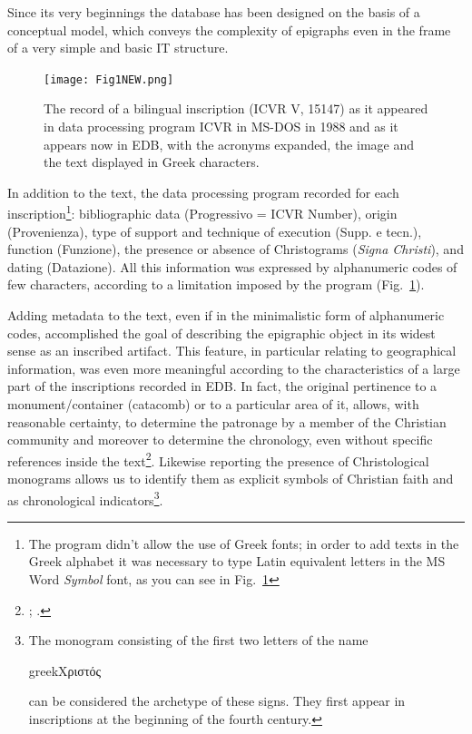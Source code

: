 \documentclass[amsthm,ebook]{saparticle}
\begin{document}
Since its very beginnings the database has been designed on the basis of a conceptual model, which conveys the
complexity of epigraphs even in the frame of a very simple and basic IT structure.



\begin{figure}[hbp]
\centering
 \texttt{[image: Fig1NEW.png]} 
\caption{The record of a bilingual inscription (ICVR V, 15147) as it appeared in data processing program ICVR in MS-DOS
in 1988 and as it appears now in EDB, with the acronyms expanded, the image and the text displayed in Greek characters.}
\label{fig:1}
\end{figure}




In addition to the text, the data processing program recorded for each inscription\footnote{ The program didn’t allow
the use of Greek fonts; in order to add texts in the Greek alphabet it was necessary to type Latin equivalent letters
in the MS Word \emph{Symbol} font, as you can see in Fig.~\ref{fig:1}}: bibliographic data (Progressivo = ICVR Number), origin
(Provenienza), type of support and technique of execution (Supp. e tecn.), function (Funzione), the presence or
absence of Christograms (\emph{Signa Christi}), and dating (Datazione). All this information was expressed by alphanumeric
codes of few characters, according to a limitation imposed by the program (Fig.~\ref{fig:1}).
%
%



Adding metadata to the text, even if in the minimalistic form of alphanumeric codes, accomplished the goal of describing
the epigraphic object in its widest sense as an inscribed artifact. This feature, in particular relating to
geographical information, was even more meaningful according to the characteristics of a large part of the inscriptions
recorded in EDB. In fact, the original pertinence to a monument/container (catacomb) or to a particular area of it,
allows, with reasonable certainty, to determine the patronage by a member of the Christian community and moreover to
determine the chronology, even without specific references inside the text\footnote{\citet{carletti_inscriptiones_1994}; \citet[viii-ix]{felle_introduzione_1997}.}. Likewise reporting the presence of Christological monograms allows us to identify them as explicit symbols
of Christian faith and as chronological indicators\footnote{ The monogram consisting of the first two letters of the
name \begin{otherlanguage*}{greek}Χριστός\end{otherlanguage*} can be considered the archetype of these signs. They first appear in inscriptions at the
beginning of the fourth century.}. 
\end{document}
